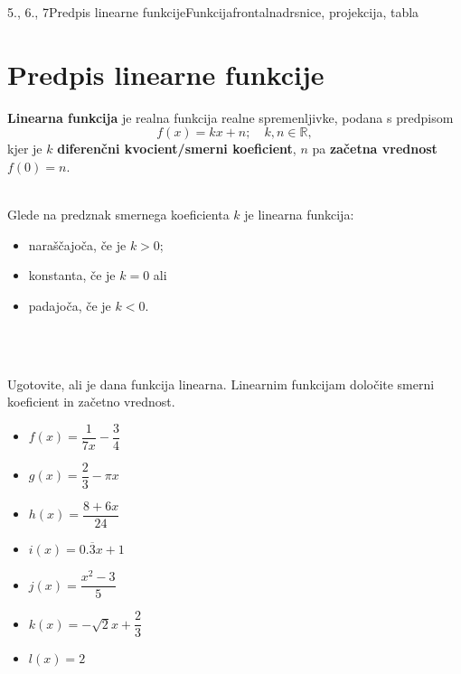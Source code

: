 \begin{priprava}{5., 6., 7}{}{Predpis linearne funkcije}{Funkcija}{frontalna}{drsnice, projekcija, tabla}




        \section{Predpis linearne funkcije}
        
                \textbf{Linearna funkcija} je realna funkcija realne spremenljivke, podana s predpisom 
                $$f(x)=kx+n;\quad k,n\in\mathbb{R},$$
                kjer je $k$ \textbf{diferenčni kvocient/smerni koeficient}, $n$ pa \textbf{začetna vrednost} $f(0)=n$.

                ~\\
                Glede na predznak smernega koeficienta $k$ je linearna funkcija:
                \begin{itemize}
                    \item naraščajoča, če je $k>0$;
                    \item konstanta, če je $k=0$ ali
                    \item padajoča, če je $k<0$.
                \end{itemize}

                ~\\~

        
            \begin{naloga}
                Ugotovite, ali je dana funkcija linearna. Linearnim funkcijam določite smerni koeficient in začetno vrednost.
                \begin{multicols}{2}
                \begin{itemize}
                        \item $f(x)=\dfrac{1}{7x}-\dfrac{3}{4}$ 
                        \item $g(x)=\dfrac{2}{3}-\pi x$ 
                        \item $h(x)=\dfrac{8+6x}{24}$ 
                        \item $i(x)=0.\overline{3}x+1$ 
                        \item $j(x)=\dfrac{x^2-3}{5}$ 
                        \item $k(x)=-\sqrt{2}x+\dfrac{2}{3}$ 
                        \item $l(x)=2$ 
                    \end{itemize}
                \end{multicols}
            \end{naloga}
        




\end{priprava}
